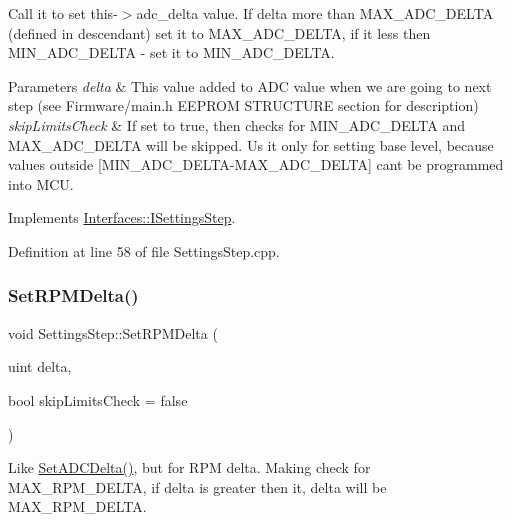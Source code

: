 Call it to set this-\/$>$adc\+\_\+delta value. If delta more than M\+A\+X\+\_\+\+A\+D\+C\+\_\+\+D\+E\+L\+TA (defined in descendant) set it to M\+A\+X\+\_\+\+A\+D\+C\+\_\+\+D\+E\+L\+TA, if it less then M\+I\+N\+\_\+\+A\+D\+C\+\_\+\+D\+E\+L\+TA -\/ set it to M\+I\+N\+\_\+\+A\+D\+C\+\_\+\+D\+E\+L\+TA. 


\begin{DoxyParams}{Parameters}
{\em delta} & This value added to A\+DC value when we are going to next step (see Firmware/main.\+h E\+E\+P\+R\+OM S\+T\+R\+U\+C\+T\+U\+RE section for description) \\
\hline
{\em skip\+Limits\+Check} & If set to true, then checks for M\+I\+N\+\_\+\+A\+D\+C\+\_\+\+D\+E\+L\+TA and M\+A\+X\+\_\+\+A\+D\+C\+\_\+\+D\+E\+L\+TA will be skipped. Us it only for setting base level, because values outside \mbox{[}M\+I\+N\+\_\+\+A\+D\+C\+\_\+\+D\+E\+L\+T\+A-\/\+M\+A\+X\+\_\+\+A\+D\+C\+\_\+\+D\+E\+L\+TA\mbox{]} can\textquotesingle{}t be programmed into M\+CU. \\
\hline
\end{DoxyParams}


Implements \hyperlink{class_interfaces_1_1_i_settings_step_a83f00b8b66f6566721065e34e41508c6}{Interfaces\+::\+I\+Settings\+Step}.



Definition at line 58 of file Settings\+Step.\+cpp.

\mbox{\label{class_settings_step_a25ddaf1d4d77727b8f87b5f8588f2de1}} 
\subsubsection{\texorpdfstring{Set\+R\+P\+M\+Delta()}{SetRPMDelta()}}
{\footnotesize\ttfamily void Settings\+Step\+::\+Set\+R\+P\+M\+Delta (\begin{DoxyParamCaption}\item[{uint}]{delta,  }\item[{bool}]{skip\+Limits\+Check = {\ttfamily false} }\end{DoxyParamCaption})\hspace{0.3cm}{\ttfamily [virtual]}}



Like \hyperlink{class_settings_step_a8124c87ae0b1d9fb3b623144d0e492db}{Set\+A\+D\+C\+Delta()}, but for R\+PM delta. Making check for M\+A\+X\+\_\+\+R\+P\+M\+\_\+\+D\+E\+L\+TA, if delta is greater then it, delta will be M\+A\+X\+\_\+\+R\+P\+M\+\_\+\+D\+E\+L\+TA. 


